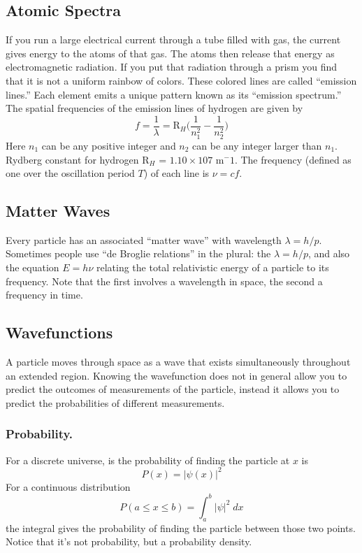 \documentclass[../../main.tex]{subfiles}
\begin{document}
\subsection{Atomic Spectra}
If you run a large electrical current through a tube filled with gas, the current gives energy to the atoms of that gas. The atoms then release that energy as electromagnetic radiation. If you put that radiation through a prism you find that it is not a uniform rainbow of colors. These colored lines are called “emission lines.” Each element emits a unique pattern known as its “emission spectrum.” The spatial frequencies of the emission lines of hydrogen are given by
\begin{equation*}
    f=\frac{1}{\lambda}=\text{R}_H\biggl(\frac{1}{n_1^2}-\frac{1}{n_2^2}\biggr)
\end{equation*}
Here $n_1$ can be any positive integer and $n_2$ can be any integer larger than $n_1$. Rydberg constant
for hydrogen R$_H$ = $1.10 \times 10 7$ m${^-1}$. The frequency (defined as one over the oscillation period $T$) of each line is $\nu = cf $.

\subsection{Matter Waves}
Every particle has an associated “matter wave” with wavelength $ \lambda = h/p$. Sometimes people use “de Broglie relations” in the plural: the $ \lambda = h/p$, and also the equation $E = h\nu$ relating the total relativistic energy of a particle to its frequency. Note that the first involves a wavelength in space, the second a frequency in time.

\subsection{Wavefunctions }
A particle moves through space as a wave that exists simultaneously throughout an extended region. Knowing the wavefunction does not in general allow you to predict the outcomes of measurements of the particle, instead it allows you to predict the probabilities of different measurements.

\subsubsection{Probability.} For a discrete universe, is the probability of finding the particle at $x$ is
\begin{equation*}
    P(x)=|\psi(x)|^2
\end{equation*}
For a continuous distribution 
\begin{equation*}
    P(a\leq x \leq b)=\int_{a}^{b}|\psi|^2\;dx
\end{equation*}
the integral gives the probability of finding the particle between those two points. Notice that it's not probability, but a probability density.
\end{document}
